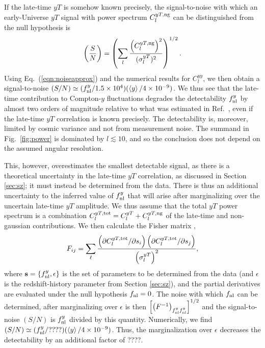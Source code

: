 \documentclass[aps,twocolumn,floats,prd,nofootinbib,10pt,floatfix]{revtex4-1}
\def\VEV#1{\left\langle #1 \right\rangle}
\begin{document}
If the late-time $yT$ is somehow known precisely, the
signal-to-noise with which an early-Universe $yT$ signal with
power spectrum $C_l^{yT,{\rm ng}}$ can be distinguished from the
null hypothesis is
\begin{equation}
     \left(\frac{S}{N} \right) = \left(\sum_l\frac{\left(C_l^{yT,{\rm ng}}
     \right)^2}{(\sigma_l^{yT})^2}\right)^{1/2}.
\label{eqn:SN}
\end{equation}
Using Eq.~(\ref{eqn:noiseapprox}) and the numerical results for
$C_l^{yy}$, we then obtain a signal-to-noise $(S/N) \simeq  (f_{\rm
nl}^y/1.5\times 10^4) (\VEV{y}/4\times 10^{-9})$.  We thus see
that the late-time contribution to Compton-$y$ fluctuations
degrades the detectability $f_{\rm nl}^y$ by almost two orders
of magnitude relative to what was estimated in
Ref.~\cite{Emami:2015xqa}, even if the late-time $yT$
correlation is known precisely.  The detectability is, moreover,
limited by cosmic variance and not from measurement noise.
The summand in Fig.~\ref{fig:power} is dominated by $l\lesssim
10$, and so the conclusion does not depend on the assumed
angular resolution.

This, however, overestimates the smallest detectable
signal, as there is a theoretical uncertainty in the late-time
$yT$ correlation, as discussed in Section \ref{sec:sz}; it must
instead be determined from the data.  There is thus an
additional uncertainty to the inferred value of $f_{\rm nl}^y$
that will arise after marginalizing over the uncertain late-time
$yT$ amplitude.  We thus assume that the total $yT$ power
spectrum is a combination $C_l^{yT,{\rm tot}} = C_l^{yT}+
C_l^{yT,{\rm ng}}$ of the late-time and non-gaussian
contributions.  We then calculate the Fisher matrix
\cite{Jungman:1995bz},
\begin{equation}
     F_{ij} = \sum_\ell \frac{\left( \partial C_l^{yT,{\rm
     tot}}/\partial s_i \right) \left( \partial C_l^{yT,{\rm tot}}/\partial
     s_j\right)}{\left(\sigma_l^{yT} \right)^2},
\label{eqn:fisher}
\end{equation}
where $\mathbf{s} = \{f_{\rm nl}^y,\epsilon\}$ is the set of
parameters to be determined from the data (and $\epsilon$ is the
redshift-history parameter from Section \ref{sec:sz}), and the
partial derivatives are evaluated under the null hypothesis
$f_{\rm nl}=0$.  The noise with which $f_{\rm nl}$ can be
determined, after marginalizing over $\epsilon$ is then
$\left[\left(F^{-1} \right)_{f_{\rm nl}^y f_{\rm nl}^y}
\right]^{1/2}$ and the signal-to-noise $(S/N)$ is $f_{\rm nl}^y$
divided by this quantity.  Numerically, we find $(S/N) \simeq
(f_{\rm nl}^y/????)( \VEV{y} / 4\times 10^{-9})$.  Thus, the
marginalization over $\epsilon$ decreases the detectability by
an additional factor of ????.
\end{document}
